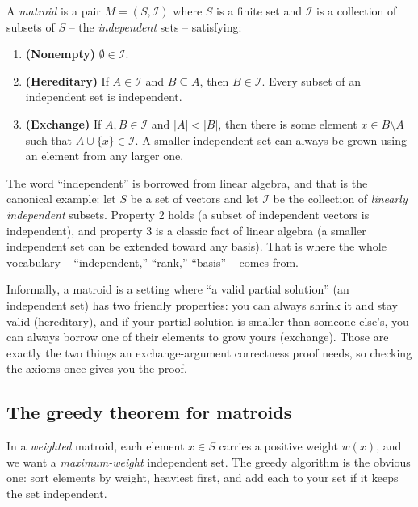 \begin{definition}[Matroid]
\label{ch16:def-matroid}
A \emph{matroid} is a pair $M = (S, \mathcal{I})$ where $S$ is a finite set and
$\mathcal{I}$ is a collection of subsets of $S$ -- the \emph{independent} sets --
satisfying:
\begin{enumerate}
\item \textbf{(Nonempty)} $\emptyset \in \mathcal{I}$.
\item \textbf{(Hereditary)} If $A \in \mathcal{I}$ and $B \subseteq A$, then
  $B \in \mathcal{I}$. Every subset of an independent set is independent.
\item \textbf{(Exchange)} If $A, B \in \mathcal{I}$ and $|A| < |B|$, then there is
  some element $x \in B \setminus A$ such that $A \cup \{x\} \in \mathcal{I}$.
  A smaller independent set can always be grown using an element from any larger
  one.
\end{enumerate}
\end{definition}

The word ``independent'' is borrowed from linear algebra, and that is the
canonical example: let $S$ be a set of vectors and let $\mathcal{I}$ be the
collection of \emph{linearly independent} subsets. Property 2 holds (a subset of
independent vectors is independent), and property 3 is a classic fact of linear
algebra (a smaller independent set can be extended toward any basis). That is
where the whole vocabulary -- ``independent,'' ``rank,'' ``basis'' -- comes from.

\begin{intuitionbox}
Informally, a matroid is a setting where ``a valid
partial solution'' (an independent set) has two friendly properties: you can
always shrink it and stay valid (hereditary), and if your partial solution is
smaller than someone else's, you can always borrow one of their elements to grow
yours (exchange). Those are exactly the two things an exchange-argument
correctness proof needs, so checking the axioms once gives you the proof.
\end{intuitionbox}

\subsection{The greedy theorem for matroids}

In a \emph{weighted} matroid, each element $x \in S$ carries a positive weight
$w(x)$, and we want a \emph{maximum-weight} independent set. The greedy algorithm
is the obvious one: sort elements by weight, heaviest first, and add each to your
set if it keeps the set independent.


